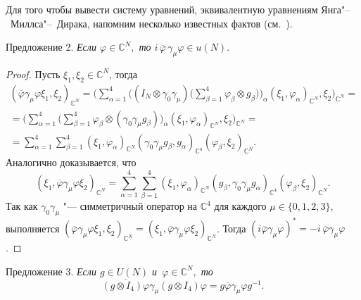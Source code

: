 Для того чтобы вывести систему уравнений, эквивалентную уравнениям Янга"--~Миллса"--~Дирака, напомним несколько известных фактов (см.~\cite{volkov:bib:Gross}).

\smallskip

\hypertarget{volk:pr2}{}

{\small \sc Предложение 2.} {\it
\label{volk:qcdprop2}
Если $\varphi\in \mathbb{C}^N,$ то
$i\,\overline{\varphi}\,\gamma_\mu \varphi\in u(N).$
}

\smallskip

\begin{proof}
Пусть $\xi_1, \xi_2\in \mathbb{C}^N$, тогда
\begin{multline*}
(\overline{\varphi}\gamma_\mu \varphi\xi_1,\xi_2)_{\mathbb{C}^N}
=
\biggl (
\sum_{\alpha=1}^4 \biggl((I_N\otimes\gamma_0\gamma_\mu)
\biggl(\sum_{\beta=1}^4\varphi_\beta\otimes g_\beta \biggr) \biggr)_\alpha(\xi_1,\varphi_\alpha)_{\mathbb{C}^N},\xi_2 \biggr)_{\mathbb{C}^N}=\\
=
\biggl(\sum_{\alpha=1}^4
\biggl(\sum_{\beta=1}^4\varphi_\beta\otimes (\gamma_0\gamma_\mu g_\beta)\biggr)_\alpha(\xi_1,\varphi_\alpha)_{\mathbb{C}^N},\xi_2\biggr)_{\mathbb{C}^N}=\\
=\sum_{\alpha=1}^4\sum_{\beta=1}^4(\xi_1,\varphi_\alpha)_{\mathbb{C}^N}(\gamma_0\gamma_\mu g_\beta,g_\alpha)_{\mathbb{C}^4}(\varphi_\beta,\xi_2)_{\mathbb{C}^N}.
\end{multline*}
Аналогично доказывается, что
$$
(\xi_1,\overline{\varphi}\gamma_\mu \varphi\xi_2)_{\mathbb{C}^N}
=\sum_{\alpha=1}^4\sum_{\beta=1}^4(\xi_1,\varphi_\alpha)_{\mathbb{C}^N}(g_\beta,\gamma_0\gamma_\mu g_\alpha)_{\mathbb{C}^4}(\varphi_\beta,\xi_2)_{\mathbb{C}^N}.
$$
Так как $\gamma_0\gamma_\mu$ "--- симметричный оператор на $\mathbb{C}^4$ для каждого $\mu\in\{0, 1, 2, 3\}$, выполняется $(\overline{\varphi}\gamma_\mu \varphi\xi_1,\xi_2)_{\mathbb{C}^N}=(\xi_1,\overline{\varphi}\gamma_\mu \varphi\xi_2)_{\mathbb{C}^N}$.
Тогда $(i\overline{\varphi}\gamma_\mu \varphi)^\ast=-i\, \overline{\varphi}\gamma_\mu \varphi$.
\end{proof}

\smallskip

\hypertarget{volk:pr3}{}


{\small\sc Предложение 3.} {\it
\label{volk:qcdprop2}
Если $g\in U(N)$  и~$\varphi\in \mathbb{C}^N,$ то
$$
\overline{(g\otimes I_4)\varphi}\gamma_\mu (g\otimes I_4)\varphi=g\overline{\varphi}\gamma_\mu \varphi g^{-1}.
$$
}

